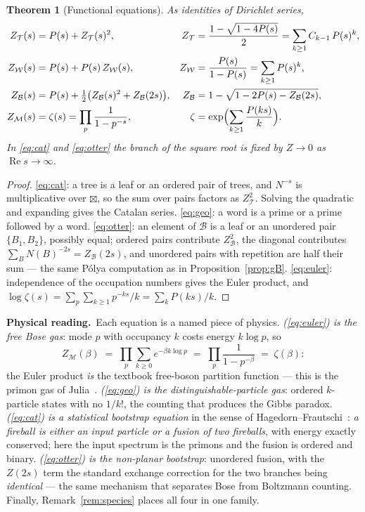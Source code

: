 \documentclass[11pt]{article}
\newcommand{\cT}{\mathcal{T}}   %
\newcommand{\cW}{\mathcal{W}}   %
\newcommand{\cB}{\mathcal{B}}   %
\newcommand{\cM}{\mathcal{M}}   %
\newcommand{\physread}{\medskip\noindent\textbf{Physical reading.}\ }
\numberwithin{equation}{section}
\theoremstyle{plain}
\newtheorem{theorem}{Theorem}[section]
\theoremstyle{definition}
\theoremstyle{remark}
\begin{document}
\begin{theorem}[Functional equations]\label{thm:funceq}
As identities of Dirichlet series,
\begin{align}
Z_\cT(s) &= P(s) + Z_\cT(s)^2,
& Z_\cT &= \frac{1 - \sqrt{1 - 4P(s)}}{2} = \sum_{k\ge1} C_{k-1}\,P(s)^k,
\label{eq:cat}\\
Z_\cW(s) &= P(s) + P(s)\,Z_\cW(s),
& Z_\cW &= \frac{P(s)}{1-P(s)} = \sum_{k \ge 1} P(s)^k,
\label{eq:geo}\\
Z_\cB(s) &= P(s) + \tfrac12\bigl(Z_\cB(s)^2 + Z_\cB(2s)\bigr),
& Z_\cB &= 1 - \sqrt{1 - 2P(s) - Z_\cB(2s)},
\label{eq:otter}\\
Z_\cM(s) &= \zeta(s) = \prod_p \frac{1}{1-p^{-s}},
& \zeta &= \exp\Bigl(\sum_{k \ge 1} \frac{P(ks)}{k}\Bigr).
\label{eq:euler}
\end{align}
In \eqref{eq:cat} and \eqref{eq:otter} the branch of the square root is fixed by
$Z \to 0$ as $\operatorname{Re} s \to \infty$.
\end{theorem}

\begin{proof}
\eqref{eq:cat}: a tree is a leaf or an ordered pair of trees, and $N^{-s}$ is
multiplicative over $\boxtimes$, so the sum over pairs factors as $Z_\cT^2$. Solving
the quadratic and expanding gives the Catalan series.
\eqref{eq:geo}: a word is a prime or a prime followed by a word.
\eqref{eq:otter}: an element of $\cB$ is a leaf or an unordered pair
$\{B_1,B_2\}$, possibly equal; ordered pairs contribute $Z_\cB^2$, the diagonal
contributes $\sum_B N(B)^{-2s} = Z_\cB(2s)$, and unordered pairs with repetition are
half their sum --- the same P\'olya computation as in Proposition~\ref{prop:gB}.
\eqref{eq:euler}: independence of the occupation numbers gives the Euler product, and
$\log \zeta(s) = \sum_p \sum_{k\ge1} p^{-ks}/k = \sum_k P(ks)/k$.
\end{proof}

\physread Each equation is a named piece of physics.
\emph{(\ref{eq:euler}) is the free Bose gas}: mode $p$ with occupancy $k$ costs energy
$k \log p$, so
\[
Z_\cM(\beta) \;=\; \prod_p \sum_{k \ge 0} e^{-\beta k \log p}
\;=\; \prod_p \frac{1}{1 - p^{-\beta}} \;=\; \zeta(\beta):
\]
the Euler product \emph{is} the textbook free-boson partition function --- this is the
primon gas of Julia~\cite{julia}.
\emph{(\ref{eq:geo}) is the distinguishable-particle gas}: ordered $k$-particle states
with no $1/k!$, the counting that produces the Gibbs paradox.
\emph{(\ref{eq:cat}) is a statistical bootstrap equation} in the sense of
Hagedorn--Frautschi~\cite{hagedorn,frautschi}: \emph{a fireball is either an input
particle or a fusion of two fireballs}, with energy exactly conserved; here the input
spectrum is the primons and the fusion is ordered and binary.
\emph{(\ref{eq:otter}) is the non-planar bootstrap}: unordered fusion, with the
$Z(2s)$ term the standard exchange correction for the two branches being
\emph{identical} --- the same mechanism that separates Bose from Boltzmann counting.
Finally, Remark~\ref{rem:species} places all four in one family.
\end{document}

